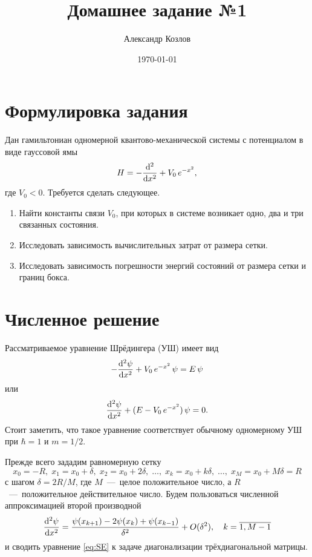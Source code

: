 \documentclass[10pt]{article}
\title{Домашнее задание №1}
\author{Александр Козлов}
\date{\today}
\begin{document}
\maketitle

\section*{Формулировка задания}

Дан гамильтониан одномерной квантово-механической системы с потенциалом в виде гауссовой ямы
\begin{equation}
    H = - \dv[2]{}{x} + V_0\, e^{-x^2},
\end{equation}
где $V_0 < 0$. Требуется сделать следующее.

\begin{enumerate}
    \item Найти константы связи $V_0$, при которых в системе возникает одно, два и три связанных состояния.

    \item Исследовать зависимость вычислительных затрат от размера сетки.

    \item Исследовать зависимость погрешности энергий состояний от размера сетки и границ бокса.
\end{enumerate}

\section{Численное решение}

Рассматриваемое уравнение Шрёдингера (УШ) имеет вид
\begin{equation}
    -\dv[2]{\psi}{x} + V_0\, e^{-x^2}\, \psi  = E\, \psi
    \label{eq:SE}
\end{equation}
или
\begin{equation}
    \dv[2]{\psi}{x}  + (E - V_0\, e^{-x^2})\, \psi  = 0.
\end{equation}
Стоит заметить, что такое уравнение соответствует обычному одномерному УШ при $\hbar=1$ и $m=1/2$. 

Прежде всего зададим равномерную сетку
\begin{equation}
    x_0 = -R,\; x_1 = x_0 + \delta,\; x_2 = x_0 + 2\delta,\; \ldots,\; x_k = x_0 + k\delta,\; \ldots,\; x_M = x_0 + M \delta = R
\end{equation}
с шагом $\delta = 2R/M$, где $M$~---~целое положительное число, а $R$~---~положительное действительное число. Будем пользоваться численной аппроксимацией второй производной
\begin{equation}
    \dv[2]{\psi}{x}(x_k) = \dfrac{\psi(x_{k+1}) - 2\psi(x_{k}) + \psi(x_{k-1})}{\delta^2} + O(\delta^2),\quad k = \overline{1,M-1}
\end{equation}
и сводить уравнение \eqref{eq:SE} к задаче диагонализации трёхдиагональной матрицы. 
\end{document}
